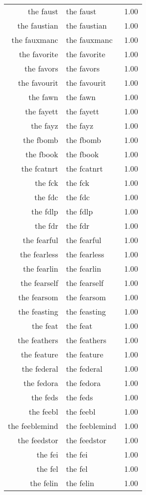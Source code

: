 \begin{table}[ht]
\begin{tabular}{rlr}
  the faust & the faust & 1.00 \\ 
  the faustian & the faustian & 1.00 \\ 
  the fauxmanc & the fauxmanc & 1.00 \\ 
  the favorite & the favorite & 1.00 \\ 
  the favors & the favors & 1.00 \\ 
  the favourit & the favourit & 1.00 \\ 
  the fawn & the fawn & 1.00 \\ 
  the fayett & the fayett & 1.00 \\ 
  the fayz & the fayz & 1.00 \\ 
  the fbomb & the fbomb & 1.00 \\ 
  the fbook & the fbook & 1.00 \\ 
  the fcatnrt & the fcatnrt & 1.00 \\ 
  the fck & the fck & 1.00 \\ 
  the fdc & the fdc & 1.00 \\ 
  the fdlp & the fdlp & 1.00 \\ 
  the fdr & the fdr & 1.00 \\ 
  the fearful & the fearful & 1.00 \\ 
  the fearless & the fearless & 1.00 \\ 
  the fearlin & the fearlin & 1.00 \\ 
  the fearself & the fearself & 1.00 \\ 
  the fearsom & the fearsom & 1.00 \\ 
  the feasting & the feasting & 1.00 \\ 
  the feat & the feat & 1.00 \\ 
  the feathers & the feathers & 1.00 \\ 
  the feature & the feature & 1.00 \\ 
  the federal & the federal & 1.00 \\ 
  the fedora & the fedora & 1.00 \\ 
  the feds & the feds & 1.00 \\ 
  the feebl & the feebl & 1.00 \\ 
  the feeblemind & the feeblemind & 1.00 \\ 
  the feedstor & the feedstor & 1.00 \\ 
  the fei & the fei & 1.00 \\ 
  the fel & the fel & 1.00 \\ 
  the felin & the felin & 1.00 \\ 

\end{tabular}
\end{table}
